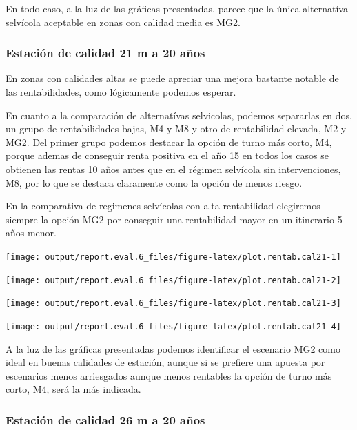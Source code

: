 \documentclass[]{article}
\begin{document}
En todo caso, a la luz de las gráficas presentadas, parece que la única
alternatíva selvícola aceptable en zonas con calidad media es MG2.

\subsubsection{Estación de calidad 21 m a 20
años}\label{estaciuxf3n-de-calidad-21-m-a-20-auxf1os}

En zonas con calidades altas se puede apreciar una mejora bastante
notable de las rentabilidades, como lógicamente podemos esperar.

En cuanto a la comparación de alternatívas selvicolas, podemos
separarlas en dos, un grupo de rentabilidades bajas, M4 y M8 y otro de
rentabilidad elevada, M2 y MG2. Del primer grupo podemos destacar la
opción de turno más corto, M4, porque ademas de conseguir renta positiva
en el año 15 en todos los casos se obtienen las rentas 10 años antes que
en el régimen selvícola sin intervenciones, M8, por lo que se destaca
claramente como la opción de menos riesgo.

En la comparativa de regimenes selvícolas con alta rentabilidad
elegiremos siempre la opción MG2 por conseguir una rentabilidad mayor en
un itinerario 5 años menor.

\begin{center}\texttt{[image: output/report.eval.6\_files/figure-latex/plot.rentab.cal21-1]} \end{center}

\begin{center}\texttt{[image: output/report.eval.6\_files/figure-latex/plot.rentab.cal21-2]} \end{center}

\begin{center}\texttt{[image: output/report.eval.6\_files/figure-latex/plot.rentab.cal21-3]} \end{center}

\begin{center}\texttt{[image: output/report.eval.6\_files/figure-latex/plot.rentab.cal21-4]} \end{center}

A la luz de las gráficas presentadas podemos identificar el escenario
MG2 como ideal en buenas calidades de estación, aunque si se prefiere
una apuesta por escenarios menos arriesgados aunque menos rentables la
opción de turno más corto, M4, será la más indicada.

\subsubsection{Estación de calidad 26 m a 20
años}\label{estaciuxf3n-de-calidad-26-m-a-20-auxf1os}
\end{document}
